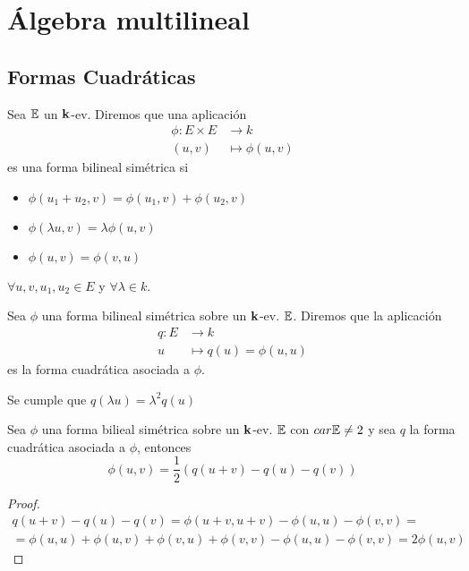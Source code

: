 \section{Álgebra multilineal}

\subsection{Formas Cuadráticas}

\begin{defi}
	Sea $\mathbb{E}$ un $\mathbf{k}$-ev. Diremos que una aplicación
	\[
		\begin{aligned}
			\phi \colon E \times E &\to k \\
			(u,v) &\mapsto \phi(u,v)
		\end{aligned}
	\]
	es una forma bilineal simétrica si \begin{itemize}
		\item $\phi(u_1 + u_2, v) = \phi(u_1, v) + \phi(u_2, v)$
		\item $\phi(\lambda u, v) = \lambda\phi(u,v)$
		\item $\phi(u,v) = \phi(v,u)$
	\end{itemize}
	$\forall u,v,u_1,u_2 \in E$ y $\forall \lambda \in k$.
\end{defi}
\begin{defi}
	Sea $\phi$ una forma bilineal simétrica sobre un $\mathbf{k}$-ev. $\mathbb{E}$.
	Diremos que la aplicación
	\[
		\begin{aligned}
			q \colon E &\to k \\
			u &\mapsto q(u) = \phi(u,u)
		\end{aligned}
	\]
	es la forma cuadrática asociada a $\phi$.
\end{defi}
\begin{obs}
	Se cumple que $q(\lambda u) = \lambda^2 q(u)$
\end{obs}
\begin{lema}
	Sea $\phi$ una forma bilieal simétrica sobre un $\mathbf{k}$-ev. $\mathbb{E}$ con $car \mathbb{E} \neq 2$
	y sea $q$ la forma cuadrática asociada a $\phi$, entonces
	\[
		\phi(u,v) = \frac{1}{2} ( q(u+v) - q(u) - q(v))
	\]
\end{lema}
\begin{proof}
	\[
	\begin{split}
		q(u+v) - q(u) - q(v) = \phi(u+v,u+v) - \phi(u,u) - \phi(v,v) = \\
		=\phi(u,u) + \phi(u,v) + \phi(v,u)  + \phi(v,v) - \phi(u,u) - \phi(v,v) =
		2 \phi(u,v)
	\end{split}
	\]
\end{proof}
